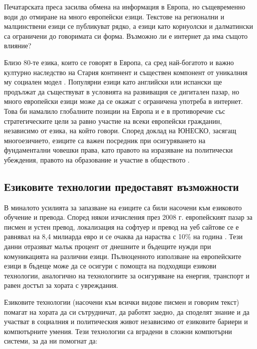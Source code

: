 \documentclass[]{../../metanetpaper}
\begin{document}
\begin{multicols}{2}
Печатарската преса засилва обмена на информация в Европа, но същевременно води до отмиране на много европейски езици. Текстове на регионални и малцинствени езици се публикуват рядко, а  езици като корнуолски и далматински са ограничени до говоримата си форма. Възможно ли е интернет да има същото влияние?


Близо  80-те езика, които се говорят в Европа, са сред
 най-богатото и важно културно наследство на Стария континент и съществен  компонент от уникалния му социален модел  \cite{EC2}. Популярни езици като английски или испански ще продължат да съществуват в условията на развиващия се дигитален пазар, но много европейски езици може да се окажат
с ограничена употреба в интернет. Това би намалило глобалните позиции на Европа и е в противоречие със стратегическите цели за равно участие на всеки европейски
 гражданин, независимо от езика, на който говори. Според доклад на ЮНЕСКО, засягащ многоезичието,  езиците са важен посредник при осигуряването на
фундаментални  човешки права, като правото
 на изразяване на политически убеждения, правото на образование и участие в обществото \cite{Unesco1}.

\subsection{Езиковите технологии предоставят възможности}

В миналото усилията за запазване на езиците са били насочени
 към езиковото обучение и превода. Според някои
 изчисления през 2008 г. европейският пазар за писмен и
 устен превод, локализация на софтуер и превод на
 уеб сайтове се е равнявал на 8,4 милиарда евро и се
 очаква да нараства с 10\% на година \cite{EC3}. Тези данни отразяват малък процент от днешните и бъдещите нужди при комуникацията на различни езици.
Пълноценното използване на европейските езици в бъдеще може да се осигури с помощта на подходящи езикови технологии, аналогично на технологиите за осигуряване  на енергия, транспорт и равен достъп за хората с увреждания.  

Езиковите технологии (насочени към всички видове писмен и говорим текст) помагат на хората да си сътрудничат, да работят заедно, да споделят знание и да участват в социалния и
 политическия живот независимо от езиковите бариери и компютърните умения. Тези технологии са вградени в сложни компютърни системи, за да ни помогнат да:


\end{multicols}
\end{document}
